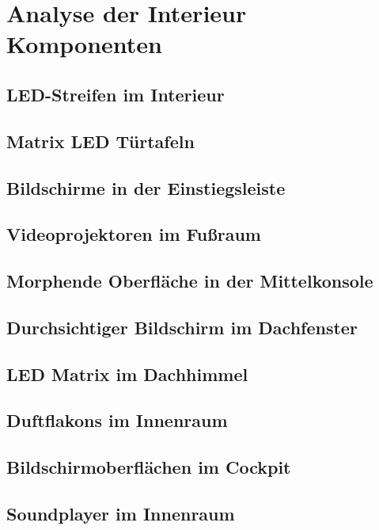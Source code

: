 \section{Analyse der Interieur Komponenten}
\subsection{LED-Streifen im Interieur}
\subsection{Matrix LED Türtafeln}
\subsection{Bildschirme in der Einstiegsleiste}
\subsection{Videoprojektoren im Fußraum}
\subsection{Morphende Oberfläche in der Mittelkonsole}
\subsection{Durchsichtiger Bildschirm im Dachfenster}
\subsection{LED Matrix im Dachhimmel}
\subsection{Duftflakons im Innenraum}
\subsection{Bildschirmoberflächen im Cockpit}
\subsection{Soundplayer im Innenraum}

